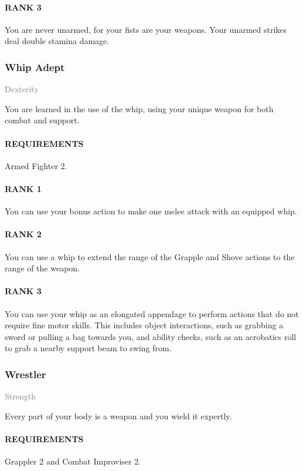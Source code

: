\paragraph{RANK 3} You are never unarmed, for your fists are your weapons.
Your unarmed strikes deal double stamina damage.

\subsubsection{Whip Adept} \label{feat::whipadept}
\small{\textcolor{gray}{Dexterity}}

\normalsize
You are learned in the use of the whip, using your unique weapon for both combat and support.
\paragraph{REQUIREMENTS} Armed Fighter 2.
\paragraph{RANK 1} You can use your bonus action to make one melee attack with an equipped whip.
\paragraph{RANK 2} You can use a whip to extend the range of the Grapple and Shove actions to the range of the weapon.
\paragraph{RANK 3} You can use your whip as an elongated appendage to perform actions that do not require fine motor skills.
This includes object interactions, such as grabbing a sword or pulling a bag towards you, and ability checks, such as an acrobatics roll to grab a nearby support beam to swing from.

\subsubsection{Wrestler} \label{feat::wrestler}
\small{\textcolor{gray}{Strength}}

\normalsize
Every part of your body is a weapon and you wield it expertly.
\paragraph{REQUIREMENTS} Grappler 2 and Combat Improviser 2.
